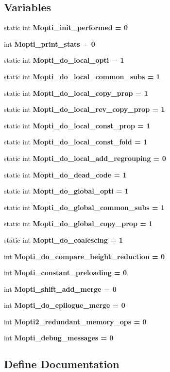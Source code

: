 \subsection*{Variables}
\begin{CompactItemize}
\item 
static int \bf{Mopti\_\-init\_\-performed} = 0
\item 
int \bf{Mopti\_\-print\_\-stats} = 0
\item 
static int \bf{Mopti\_\-do\_\-local\_\-opti} = 1
\item 
static int \bf{Mopti\_\-do\_\-local\_\-common\_\-subs} = 1
\item 
static int \bf{Mopti\_\-do\_\-local\_\-copy\_\-prop} = 1
\item 
static int \bf{Mopti\_\-do\_\-local\_\-rev\_\-copy\_\-prop} = 1
\item 
static int \bf{Mopti\_\-do\_\-local\_\-const\_\-prop} = 1
\item 
static int \bf{Mopti\_\-do\_\-local\_\-const\_\-fold} = 1
\item 
static int \bf{Mopti\_\-do\_\-local\_\-add\_\-regrouping} = 0
\item 
static int \bf{Mopti\_\-do\_\-dead\_\-code} = 1
\item 
static int \bf{Mopti\_\-do\_\-global\_\-opti} = 1
\item 
static int \bf{Mopti\_\-do\_\-global\_\-common\_\-subs} = 1
\item 
static int \bf{Mopti\_\-do\_\-global\_\-copy\_\-prop} = 1
\item 
static int \bf{Mopti\_\-do\_\-coalescing} = 1
\item 
int \bf{Mopti\_\-do\_\-compare\_\-height\_\-reduction} = 0
\item 
int \bf{Mopti\_\-constant\_\-preloading} = 0
\item 
int \bf{Mopti\_\-shift\_\-add\_\-merge} = 0
\item 
int \bf{Mopti\_\-do\_\-epilogue\_\-merge} = 0
\item 
int \bf{Mopti2\_\-redundant\_\-memory\_\-ops} = 0
\item 
int \bf{Mopti\_\-debug\_\-messages} = 0
\end{CompactItemize}


\subsection{Define Documentation}
